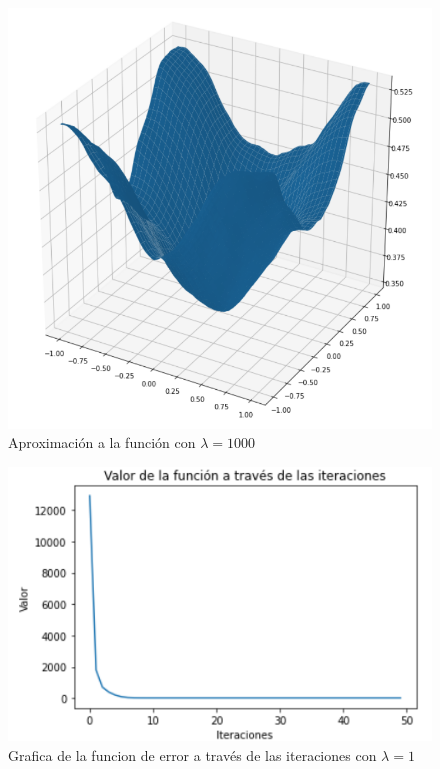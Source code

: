 \documentclass[conference]{IEEEtran}
\begin{document}
\begin{figure}[htbp]
    \centerline{\includegraphics[scale=0.25]{r1000.png}}
    \caption{Aproximación a la función con $\lambda=1000$}
    \label{r1000}
\end{figure}

\begin{figure}[htbp]
    \centerline{\includegraphics[scale=0.25]{r1f.png}}
    \caption{Grafica de la funcion de error a través de las iteraciones con $\lambda=1$}
    \label{r1f}
\end{figure}
\end{document}
